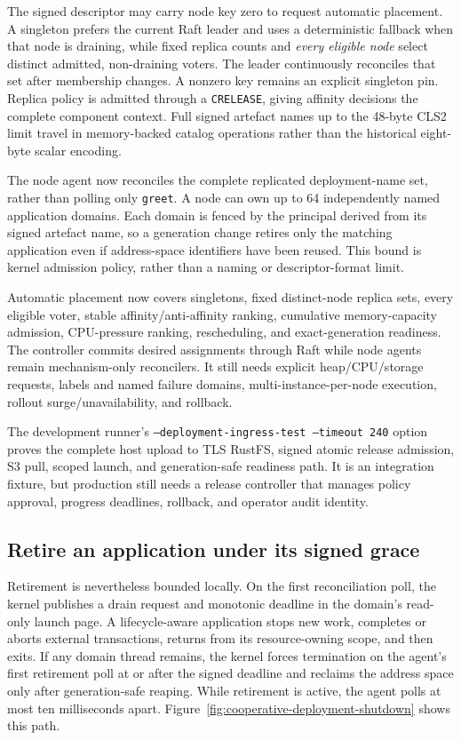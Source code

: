 The signed descriptor may carry node key zero to request automatic placement.
A singleton prefers the current Raft leader and uses a deterministic fallback
when that node is draining, while fixed replica counts and
\emph{every eligible node} select distinct admitted, non-draining voters. The
leader continuously reconciles that set after membership changes. A nonzero
key remains an explicit singleton pin. Replica policy is admitted through a
\texttt{CRELEASE}, giving affinity decisions the complete component context.
Full signed artefact names
up to the 48-byte CLS2 limit travel in memory-backed catalog operations rather
than the historical eight-byte scalar encoding.

The node agent now reconciles the complete replicated deployment-name set,
rather than polling only \texttt{greet}. A node can own up to 64 independently
named application domains. Each domain is fenced by the principal derived from
its signed artefact name, so a generation change retires only the matching
application even if address-space identifiers have been reused. This bound is
kernel admission policy, rather than a naming or descriptor-format limit.

Automatic placement now covers singletons, fixed distinct-node replica sets,
every eligible voter, stable affinity/anti-affinity ranking, cumulative
memory-capacity admission, CPU-pressure ranking, rescheduling, and
exact-generation readiness. The controller commits desired assignments
through Raft while node agents remain mechanism-only reconcilers. It still
needs explicit heap/CPU/storage requests, labels and named failure domains,
multi-instance-per-node execution, rollout surge/unavailability, and rollback.

The development runner's
\texttt{--deployment-ingress-test --timeout 240} option proves the complete
host upload to TLS RustFS, signed atomic release admission, S3 pull, scoped
launch, and generation-safe readiness path. It is an integration fixture, but
production still needs a release controller that manages policy approval,
progress deadlines, rollback, and operator audit identity.

\subsection{Retire an application under its signed grace}

Retirement is nevertheless bounded locally. On the first reconciliation poll,
the kernel publishes a drain request and monotonic deadline in the domain's
read-only launch page. A lifecycle-aware application stops new work, completes
or aborts external transactions, returns from its resource-owning scope, and
then exits. If any domain thread remains, the kernel forces termination on the
agent's first retirement poll at or after the signed deadline and reclaims the
address space only after generation-safe reaping. While retirement is active,
the agent polls at most ten milliseconds apart.
Figure~\ref{fig:cooperative-deployment-shutdown} shows this path.

